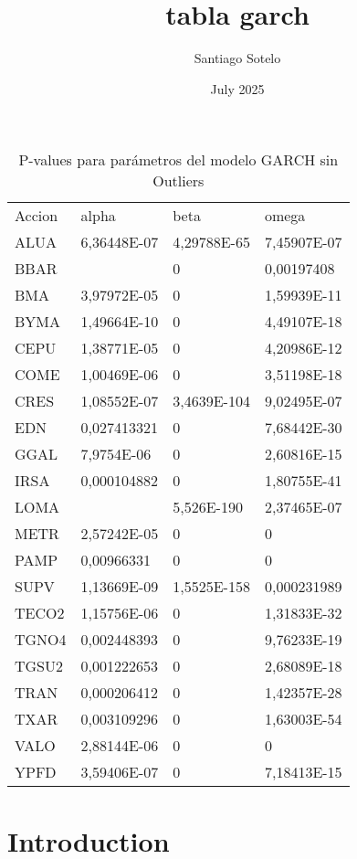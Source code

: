 \documentclass{article}
\title{tabla garch}
\author{Santiago Sotelo}
\date{July 2025}
\begin{document}
\begin{table}[]
\centering
\caption{P-values para parámetros del modelo GARCH sin Outliers}
\label{tab:my-table}
\begin{tabular}{llll}
Accion & alpha       & beta        & omega       \\
ALUA   & 6,36448E-07 & 4,29788E-65 & 7,45907E-07 \\
BBAR   &             & 0           & 0,00197408  \\
BMA    & 3,97972E-05 & 0           & 1,59939E-11 \\
BYMA   & 1,49664E-10 & 0           & 4,49107E-18 \\
CEPU   & 1,38771E-05 & 0           & 4,20986E-12 \\
COME   & 1,00469E-06 & 0           & 3,51198E-18 \\
CRES   & 1,08552E-07 & 3,4639E-104 & 9,02495E-07 \\
EDN    & 0,027413321 & 0           & 7,68442E-30 \\
GGAL   & 7,9754E-06  & 0           & 2,60816E-15 \\
IRSA   & 0,000104882 & 0           & 1,80755E-41 \\
LOMA   &             & 5,526E-190  & 2,37465E-07 \\
METR   & 2,57242E-05 & 0           & 0           \\
PAMP   & 0,00966331  & 0           & 0           \\
SUPV   & 1,13669E-09 & 1,5525E-158 & 0,000231989 \\
TECO2  & 1,15756E-06 & 0           & 1,31833E-32 \\
TGNO4  & 0,002448393 & 0           & 9,76233E-19 \\
TGSU2  & 0,001222653 & 0           & 2,68089E-18 \\
TRAN   & 0,000206412 & 0           & 1,42357E-28 \\
TXAR   & 0,003109296 & 0           & 1,63003E-54 \\
VALO   & 2,88144E-06 & 0           & 0           \\
YPFD   & 3,59406E-07 & 0           & 7,18413E-15
\end{tabular}
\end{table}

\section{Introduction}
\end{document}
